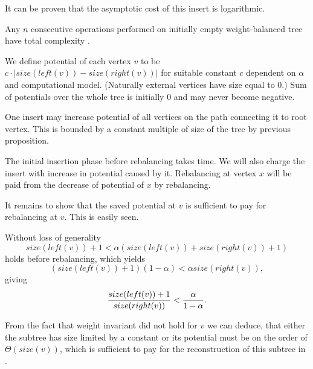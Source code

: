 It can be proven that the asymptotic cost of this insert is logarithmic.

\begin{prop}
Any $n$ consecutive operations performed on initially empty weight-balanced tree have total complexity . 
\end{prop}

\begin{myproof}
We define potential of each vertex $v$ to be $c \cdot |size(left(v)) - size(right(v))|$ for suitable constant $c$ dependent on $\alpha$ and computational model. (Naturally external vertices have size equal to 0.) Sum of potentials over the whole tree is initially 0 and may never become negative.

One insert may increase potential of all vertices on the path connecting it to root vertex. This is bounded by a constant multiple of size of the tree by previous proposition.

The initial insertion phase before rebalancing takes  time. We will also charge the insert with increase in potential caused by it. Rebalancing at vertex $x$ will be paid from the decrease of potential of $x$ by rebalancing. 

It remains to show that the saved potential at $v$ is sufficient to pay for rebalancing at $v$. This is easily seen. 

Without loss of generality
$$ size(left(v)) + 1 < \alpha ( size(left(v)) + size(right(v)) + 1 ) $$
holds before rebalancing, which yields
$$ (size(left(v)) + 1)(1 - \alpha) < \alpha size(right(v)), $$
giving
$$ { size(left(v)) + 1 \over size(right(v)) } < { \alpha \over 1 - \alpha }. $$

From the fact that weight invariant did not hold for $v$ we can deduce, that either the subtree has size limited by a constant or its potential must be on the order of $\Theta(size(v))$, which is sufficient to pay for the reconstruction of this subtree in . 
\end{myproof}
